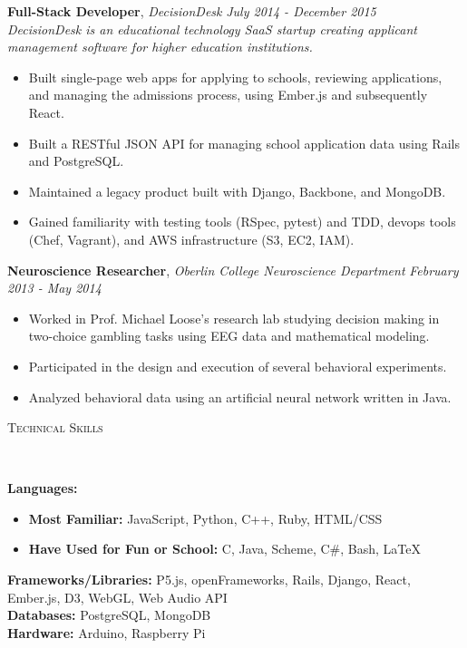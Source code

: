 \documentclass[9pt]{article}
\newenvironment{changemargin}[2]{%
  \begin{list}{}{%
    \setlength{\topsep}{0pt}%
    \setlength{\leftmargin}{#1}%
    \setlength{\rightmargin}{#2}%
    \setlength{\listparindent}{\parindent}%
    \setlength{\itemindent}{\parindent}%
    \setlength{\parsep}{\parskip}%
  }%
  \item[]}{\end{list}
}
\newcommand{\lineover}{
	\begin{changemargin}{-0.05in}{-0.05in}
		\vspace*{-8pt}
		\hrulefill \\
		\vspace*{-2pt}
	\end{changemargin}
}
\newcommand{\header}[1]{
	\begin{changemargin}{-0.5in}{-0.5in}
		\scshape{#1}\\
  	\lineover
	\end{changemargin}
}
\newenvironment{body} {
	\vspace*{-16pt}
	\begin{changemargin}{-0.25in}{-0.5in}
  }	
	{\end{changemargin}
}
\begin{document}
\begin{body}
	\textbf{Full-Stack Developer}, \emph{DecisionDesk} \hfill \emph{July 2014 - December 2015}\\
	\emph{DecisionDesk is an educational technology SaaS startup creating applicant management software for higher education institutions.}
	\vspace*{-4pt}
	\begin{itemize} \itemsep -0pt  %
		\item Built single-page web apps for applying to schools, reviewing applications, and managing the admissions process, using Ember.js and subsequently React.
		\item Built a RESTful JSON API for managing school application data using Rails and PostgreSQL.
		\item Maintained a legacy product built with Django, Backbone, and MongoDB.
		\item Gained familiarity with testing tools (RSpec, pytest) and TDD, devops tools (Chef, Vagrant),  and AWS infrastructure (S3, EC2, IAM).
	\end{itemize}

	\textbf{Neuroscience Researcher}, \emph{Oberlin College Neuroscience Department} \hfill \emph{February 2013 - May 2014}\\
	\vspace*{-4pt}
	\begin{itemize} \itemsep -0pt  %
		\item Worked in Prof. Michael Loose's research lab studying decision making in two-choice gambling tasks using EEG data and mathematical modeling.
		\item Participated in the design and execution of several behavioral experiments.
		\item Analyzed behavioral data using an artificial neural network written in Java.
	\end{itemize}
\end{body}

\smallskip

\header{Technical Skills}

\begin{body}
	\vspace{14pt}
	\textbf{Languages:}{} 
		\begin{itemize} \itemsep -0pt  %
			\item \textbf{Most Familiar:} JavaScript, Python, C++, Ruby, HTML/CSS
			\item \textbf{Have Used for Fun or School:} C, Java, Scheme, C\#, Bash, \LaTeX \\
		\end{itemize}
	\smallskip
	\textbf{Frameworks/Libraries:}{} P5.js, openFrameworks, Rails, Django, React, Ember.js, D3, WebGL, Web Audio API \\
	\smallskip
	\textbf{Databases:}{} PostgreSQL, MongoDB \\
	\smallskip
	\textbf{Hardware:}{} Arduino, Raspberry Pi \\
\end{body}
\end{document}
